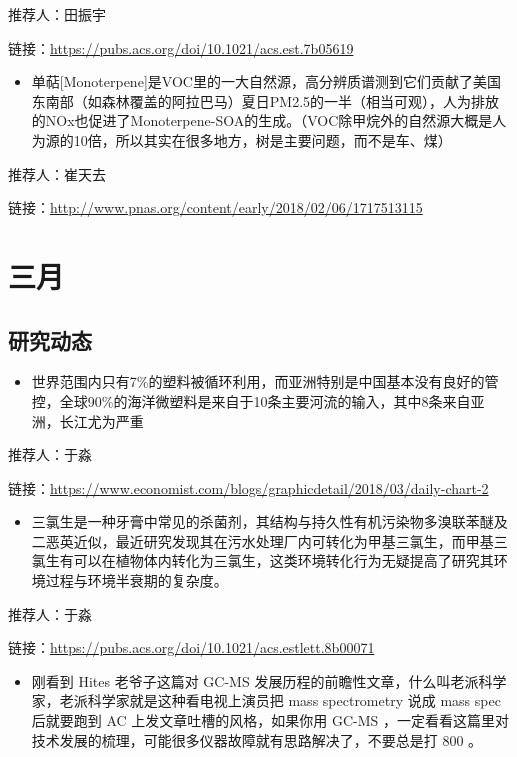 \documentclass[
]{book}
\providecommand{\tightlist}{%
  \setlength{\itemsep}{0pt}\setlength{\parskip}{0pt}}
\begin{document}
推荐人：田振宇

链接：\url{https://pubs.acs.org/doi/10.1021/acs.est.7b05619}

\begin{itemize}
\tightlist
\item
  单萜{[}Monoterpene{]}是VOC里的一大自然源，高分辨质谱测到它们贡献了美国东南部（如森林覆盖的阿拉巴马）夏日PM2.5的一半（相当可观），人为排放的NOx也促进了Monoterpene-SOA的生成。（VOC除甲烷外的自然源大概是人为源的10倍，所以其实在很多地方，树是主要问题，而不是车、煤）
\end{itemize}

推荐人：崔天去

链接：\url{http://www.pnas.org/content/early/2018/02/06/1717513115}

\hypertarget{ux4e09ux6708}{%
\section*{三月}\label{ux4e09ux6708}}

\hypertarget{ux7814ux7a76ux52a8ux6001-4}{%
\subsection*{研究动态}\label{ux7814ux7a76ux52a8ux6001-4}}

\begin{itemize}
\tightlist
\item
  世界范围内只有7\%的塑料被循环利用，而亚洲特别是中国基本没有良好的管控，全球90\%的海洋微塑料是来自于10条主要河流的输入，其中8条来自亚洲，长江尤为严重
\end{itemize}

推荐人：于淼

链接：\url{https://www.economist.com/blogs/graphicdetail/2018/03/daily-chart-2}

\begin{itemize}
\tightlist
\item
  三氯生是一种牙膏中常见的杀菌剂，其结构与持久性有机污染物多溴联苯醚及二恶英近似，最近研究发现其在污水处理厂内可转化为甲基三氯生，而甲基三氯生有可以在植物体内转化为三氯生，这类环境转化行为无疑提高了研究其环境过程与环境半衰期的复杂度。
\end{itemize}

推荐人：于淼

链接：\url{https://pubs.acs.org/doi/10.1021/acs.estlett.8b00071}

\begin{itemize}
\tightlist
\item
  刚看到 Hites 老爷子这篇对 GC-MS 发展历程的前瞻性文章，什么叫老派科学家，老派科学家就是这种看电视上演员把 mass spectrometry 说成 mass spec 后就要跑到 AC 上发文章吐槽的风格，如果你用 GC-MS ，一定看看这篇里对技术发展的梳理，可能很多仪器故障就有思路解决了，不要总是打 800 。
\end{itemize}
\end{document}
